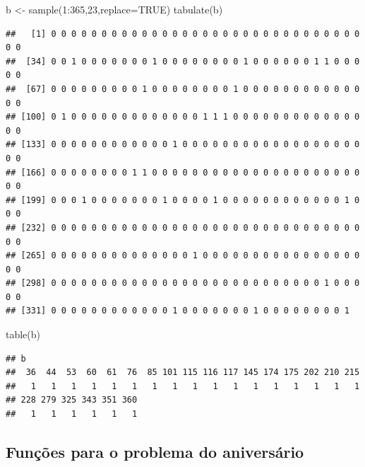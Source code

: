 \documentclass[
  11pt]{report}
\newenvironment{Shaded}{\begin{snugshade}}{\end{snugshade}}
\newcommand{\AttributeTok}[1]{\textcolor[rgb]{0.77,0.63,0.00}{#1}}
\newcommand{\ConstantTok}[1]{\textcolor[rgb]{0.00,0.00,0.00}{#1}}
\newcommand{\DecValTok}[1]{\textcolor[rgb]{0.00,0.00,0.81}{#1}}
\newcommand{\FunctionTok}[1]{\textcolor[rgb]{0.00,0.00,0.00}{#1}}
\newcommand{\NormalTok}[1]{#1}
\newcommand{\OtherTok}[1]{\textcolor[rgb]{0.56,0.35,0.01}{#1}}
\newcommand{\SpecialCharTok}[1]{\textcolor[rgb]{0.00,0.00,0.00}{#1}}
\renewenvironment{Shaded}{
    \begin{mdframed}[%
      roundcorner=2pt,%
      innerleftmargin=5pt,%
      innerrightmargin=5pt,%
      topline=true,%
      leftline=true,%
      rightline=true,%
      bottomline=true,%
      linewidth=0.5pt,%
      linecolor=black!20,%
      backgroundcolor=black!2,%
      skipabove=2ex,%
      skipbelow=2.5ex%
    ]%
  }
  {
    \end{mdframed}
  }
\begin{document}
\begin{Shaded}
\begin{Highlighting}[]
\NormalTok{b }\OtherTok{\textless{}{-}} \FunctionTok{sample}\NormalTok{(}\DecValTok{1}\SpecialCharTok{:}\DecValTok{365}\NormalTok{,}\DecValTok{23}\NormalTok{,}\AttributeTok{replace=}\ConstantTok{TRUE}\NormalTok{)}
\FunctionTok{tabulate}\NormalTok{(b)}
\end{Highlighting}
\end{Shaded}

\begin{verbatim}
##   [1] 0 0 0 0 0 0 0 0 0 0 0 0 0 0 0 0 0 0 0 0 0 0 0 0 0 0 0 0 0 0 0 0 0
##  [34] 0 0 1 0 0 0 0 0 0 0 1 0 0 0 0 0 0 0 0 1 0 0 0 0 0 0 1 1 0 0 0 0 0
##  [67] 0 0 0 0 0 0 0 0 0 1 0 0 0 0 0 0 0 0 1 0 0 0 0 0 0 0 0 0 0 0 0 0 0
## [100] 0 1 0 0 0 0 0 0 0 0 0 0 0 0 0 1 1 1 0 0 0 0 0 0 0 0 0 0 0 0 0 0 0
## [133] 0 0 0 0 0 0 0 0 0 0 0 0 1 0 0 0 0 0 0 0 0 0 0 0 0 0 0 0 0 0 0 0 0
## [166] 0 0 0 0 0 0 0 0 1 1 0 0 0 0 0 0 0 0 0 0 0 0 0 0 0 0 0 0 0 0 0 0 0
## [199] 0 0 0 1 0 0 0 0 0 0 0 1 0 0 0 0 1 0 0 0 0 0 0 0 0 0 0 0 0 1 0 0 0
## [232] 0 0 0 0 0 0 0 0 0 0 0 0 0 0 0 0 0 0 0 0 0 0 0 0 0 0 0 0 0 0 0 0 0
## [265] 0 0 0 0 0 0 0 0 0 0 0 0 0 0 1 0 0 0 0 0 0 0 0 0 0 0 0 0 0 0 0 0 0
## [298] 0 0 0 0 0 0 0 0 0 0 0 0 0 0 0 0 0 0 0 0 0 0 0 0 0 0 0 1 0 0 0 0 0
## [331] 0 0 0 0 0 0 0 0 0 0 0 0 1 0 0 0 0 0 0 0 1 0 0 0 0 0 0 0 0 1
\end{verbatim}

\begin{Shaded}
\begin{Highlighting}[]
\FunctionTok{table}\NormalTok{(b)}
\end{Highlighting}
\end{Shaded}

\begin{verbatim}
## b
##  36  44  53  60  61  76  85 101 115 116 117 145 174 175 202 210 215 
##   1   1   1   1   1   1   1   1   1   1   1   1   1   1   1   1   1 
## 228 279 325 343 351 360 
##   1   1   1   1   1   1
\end{verbatim}

\hypertarget{funuxe7uxf5es-para-o-problema-do-aniversuxe1rio}{%
\subsection*{Funções para o problema do aniversário}\label{funuxe7uxf5es-para-o-problema-do-aniversuxe1rio}}
\end{document}
